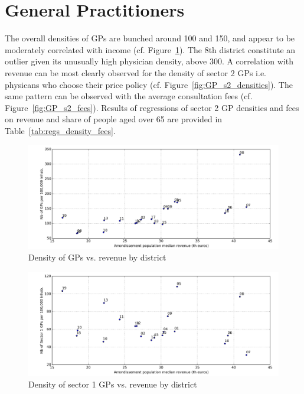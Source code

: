 \documentclass[11pt]{article}
\begin{document}
\section{General Practitioners}

The overall densities of GPs are bunched around 100 and 150, and appear to be moderately correlated with income (cf. Figure~\ref{fig:GP_densities}). The 8th district constitute an outlier given its unusually high physician density, above 300. A correlation with revenue can be most clearly observed for the density of sector 2 GPs i.e. physicans who choose their price policy (cf. Figure~\ref{fig:GP_s2_densities}). The same pattern can be observed with the average consultation fees (cf. Figure~\ref{fig:GP_s2_fees}). Results of regressions of sector 2 GP densities and fees on revenue and share of people aged over 65 are provided in Table~\ref{tab:regs_density_fees}.

\begin{figure}[H]
    \caption{Density of GPs vs. revenue by district}
		\label{fig:GP_densities}
	\centering
		\includegraphics[width=16cm]{images/GP_Ardt_DensityVsRevenue.png}
\end{figure}

\begin{figure}[H]
    \caption{Density of sector 1 GPs vs. revenue by district}
		\label{fig:GP_s1_densities}
	\centering
		\includegraphics[width=16cm]{images/GP_Ardt_DensityS1VsRevenue.png}
\end{figure}
\end{document}
